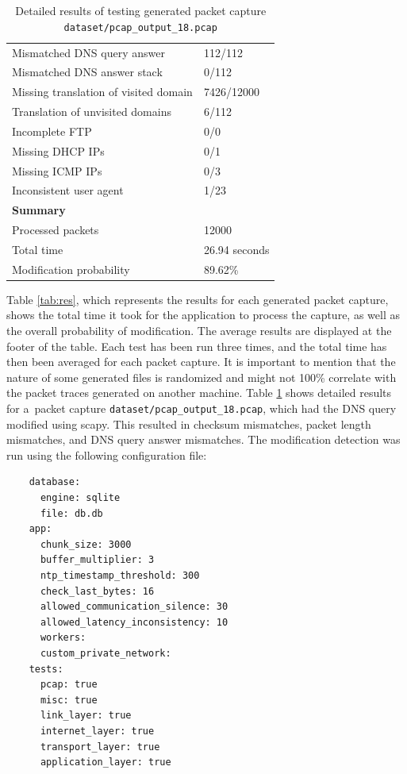\documentclass[
  printed,     %
  color,       %
  oneside,     %
  nosansbold,  %
  nocolorbold, %
  nolof,         %
  nolot,         %
]{fithesis4}
\begin{document}
\begin{table}[]
\begin{tabular}{ll}
\multicolumn{1}{l|}{Mismatched DNS query answer}           & 112/112         \\
\multicolumn{1}{l|}{Mismatched DNS answer stack}           & 0/112           \\
\multicolumn{1}{l|}{Missing translation of visited domain} & 7426/12000      \\
\multicolumn{1}{l|}{Translation of unvisited domains}      & 6/112           \\
\multicolumn{1}{l|}{Incomplete FTP}                        & 0/0             \\
\multicolumn{1}{l|}{Missing DHCP IPs}                      & 0/1             \\
\multicolumn{1}{l|}{Missing ICMP IPs}                      & 0/3             \\
\multicolumn{1}{l|}{Inconsistent user agent}               & 1/23            \\ \hline
\multicolumn{2}{l}{\textbf{Summary}}                                         \\ \hline
\multicolumn{1}{l|}{Processed packets}                     & 12000           \\
\multicolumn{1}{l|}{Total time}                            & 26.94 seconds   \\
\multicolumn{1}{l|}{Modification probability}              & 89.62\%        
\end{tabular}
\caption{\label{tab:resdet}Detailed results of testing generated packet capture \texttt{dataset/pcap\_output\_18.pcap}}
\end{table}

\newpage
Table \ref{tab:res}, which represents the results for each generated packet capture, shows the total time it took for the application to process the capture, as well as the overall probability of modification. The average results are displayed at the footer of the table. Each test has been run three times, and the total time has then been averaged for each packet capture. It is important to mention that the nature of some generated files is randomized and might not 100\% correlate with the packet traces generated on another machine. Table \ref{tab:resdet} shows detailed results for a~packet capture \texttt{dataset/pcap\_output\_18.pcap}, which had the DNS query modified using scapy. This resulted in checksum mismatches, packet length mismatches, and DNS query answer mismatches. The modification detection was run using the following configuration file:

\begin{verbatim}
    database:
      engine: sqlite
      file: db.db
    app:
      chunk_size: 3000
      buffer_multiplier: 3
      ntp_timestamp_threshold: 300
      check_last_bytes: 16
      allowed_communication_silence: 30
      allowed_latency_inconsistency: 10
      workers:
      custom_private_network:
    tests:
      pcap: true
      misc: true
      link_layer: true
      internet_layer: true
      transport_layer: true
      application_layer: true
\end{verbatim}
\end{document}
